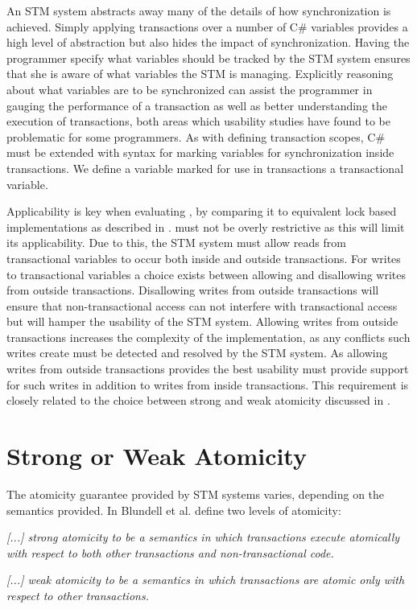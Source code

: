 An \ac{STM} system abstracts away many of the details of how synchronization is achieved. Simply applying transactions over a number of C\# variables provides a high level of abstraction but also hides the impact of synchronization. Having the programmer specify what variables should be tracked by the \ac{STM} system ensures that she is aware of what variables the \ac{STM} is managing. Explicitly reasoning about what variables are to be synchronized can assist the programmer in gauging the performance of a transaction as well as better understanding the execution of transactions, both areas which usability studies\cite{rossbach2010transactional}\cite{pankratius2009does} have found to be problematic for some programmers. As with defining transaction scopes, C\# must be extended with syntax for marking variables for synchronization inside transactions. We define a variable marked for use in transactions a transactional variable.

Applicability is key when evaluating \stmnamesp, by comparing it to equivalent lock based implementations as described in . \stmnamesp must not be overly restrictive as this will limit its applicability. Due to this, the \ac{STM} system must allow reads from transactional variables to occur both inside and outside transactions. For writes to transactional variables a choice exists between allowing and disallowing writes from outside transactions. Disallowing writes from outside transactions will ensure that non-transactional access can not interfere with transactional access but will hamper the usability of the \ac{STM} system. Allowing writes from outside transactions increases the complexity of the implementation, as any conflicts such writes create must be detected and resolved by the \ac{STM} system. As allowing writes from outside transactions provides the best usability \stmnamesp must provide support for such writes in addition to writes from inside transactions. This requirement is closely related to the choice between strong and weak atomicity discussed in .

\section{Strong or Weak Atomicity}
\label{sec:design_strong_weak_atomicity}
The atomicity guarantee provided by \ac{STM} systems varies, depending on the semantics provided. In \cite{blundell2006subtleties} Blundell et al. define two levels of atomicity:
%
\begin{defn}\label{def:strong_atomicity}
\emph{[...] strong atomicity to be a semantics in which transactions execute atomically
with respect to both other transactions and non-transactional code.}
\end{defn}
%
\begin{defn}\label{def:weak_atomicity}
\emph{[...] weak atomicity to be a semantics in which transactions are atomic only with respect to other transactions.}
\end{defn}

